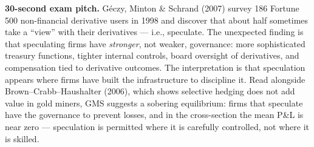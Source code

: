\documentclass[11pt]{article}
\begin{document}
\begin{keybox}
\textbf{30-second exam pitch.} Géczy, Minton \& Schrand (2007) survey 186 Fortune 500 non-financial derivative users in 1998 and discover that about half sometimes take a ``view'' with their derivatives --- i.e., speculate. The unexpected finding is that speculating firms have \emph{stronger}, not weaker, governance: more sophisticated treasury functions, tighter internal controls, board oversight of derivatives, and compensation tied to derivative outcomes. The interpretation is that speculation appears where firms have built the infrastructure to discipline it. Read alongside Brown--Crabb--Haushalter (2006), which shows selective hedging does not add value in gold miners, GMS suggests a sobering equilibrium: firms that speculate have the governance to prevent losses, and in the cross-section the mean P\&L is near zero --- speculation is permitted where it is carefully controlled, not where it is skilled.
\end{keybox}
\end{document}
